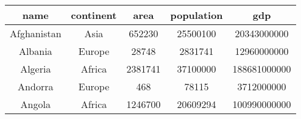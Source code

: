 \begin{tabular}{|c|c|c|c|c|}
    \hline
        \textbf{name} & \textbf{continent} & \textbf{area} & \textbf{population} & \textbf{gdp} \\ \hline
        Afghanistan & Asia & 652230 & 25500100 & 20343000000 \\ 
        Albania & Europe & 28748 & 2831741 & 12960000000 \\ 
        Algeria & Africa & 2381741 & 37100000 & 188681000000 \\ 
        Andorra & Europe & 468 & 78115 & 3712000000 \\ 
        Angola & Africa & 1246700 & 20609294 & 100990000000 \\ \hline
\end{tabular}
